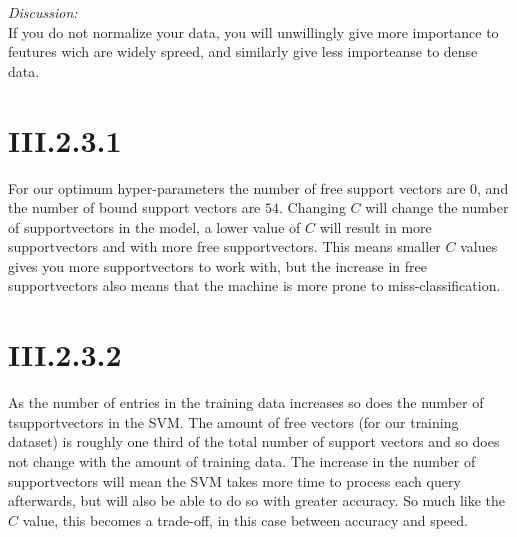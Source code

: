 \noindent \textit{Discussion:}\\
If you do not normalize your data, you will unwillingly give more importance to
feutures wich are widely spreed, and similarly give less importeanse to dense
data.

\section*{III.2.3.1}
For our optimum hyper-parameters the number of free support vectors are $0$, and
the number of bound support vectors are $54$. Changing $C$ will change the
number of supportvectors in the model, a lower value of $C$ will result in more
supportvectors and with more free supportvectors. This means smaller $C$ values
gives you more supportvectors to work with, but the increase in free
supportvectors also means that the machine is more prone to miss-classification.

\section*{III.2.3.2}
As the number of entries in the training data increases so does the number of
tsupportvectors in the SVM. The amount of free vectors (for our training
dataset) is roughly one third of the total number of support vectors and so does
not change with the amount of training data. The increase in the number of
supportvectors will mean the SVM takes more time to process each query
afterwards, but will also be able to do so with greater accuracy. So much like
the $C$ value, this becomes a trade-off, in this case between accuracy and
speed.
